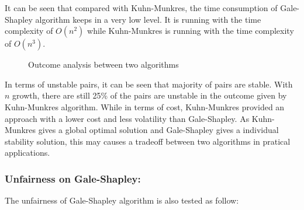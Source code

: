 \documentclass[14pt]{extarticle}
\begin{document}
It can be seen that compared with Kuhn-Munkres, the time consumption of Gale-Shapley algorithm keeps in a very low level. 
It is running with the time complexity of $O(n^2)$ while Kuhn-Munkres is running with the time complexity of $O(n^3)$.

\begin{figure}[H]
  \centering
  \quad
  \caption{Outcome analysis between two algorithms}
\end{figure}

In terms of unstable pairs, it can be seen that majority of pairs are stable.
With $n$ growth, there are still 25\% of the pairs are unstable in the outcome given by Kuhn-Munkres algorithm.
While in terms of cost, Kuhn-Munkres provided an approach with a lower cost and less volatility than Gale-Shapley.
As Kuhn-Munkres gives a global optimal solution and Gale-Shapley gives a individual stability solution, this may causes a tradeoff between two algorithms in pratical applications.

\subsubsection{Unfairness on Gale-Shapley:} 
The unfairness of Gale-Shapley algorithm is also tested as follow: \label{unfair_GS}
\end{document}
